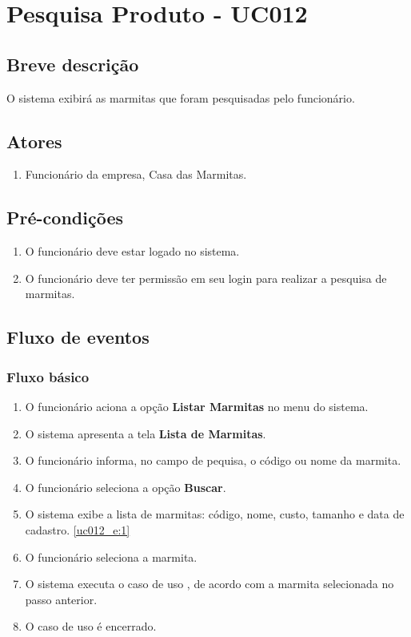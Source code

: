 \chapter{Pesquisa Produto - UC012} \label{uc012}

\section{Breve descrição}

O sistema exibirá as marmitas que foram pesquisadas pelo funcionário.

\section{Atores}

\begin{enumerate}
	\item Funcionário da empresa, Casa das Marmitas.
\end{enumerate}

\section{Pré-condições}

\begin{enumerate}
	\item O funcionário deve estar logado no sistema.
	\item O funcionário deve ter permissão em seu login para realizar a pesquisa de marmitas.
\end{enumerate}

\section{Fluxo de eventos}

\subsection{Fluxo básico}

\begin{enumerate}[label=P\arabic*]
	\item O funcionário aciona a opção \textbf{Listar Marmitas} no menu do sistema.
	\item O sistema apresenta a tela \textbf{Lista de Marmitas}. \label{uc012_p:2}	
	\item O funcionário informa, no campo de pequisa, o código ou nome da marmita.
	\item O funcionário seleciona a opção \textbf{Buscar}.
	\item O sistema exibe a lista de marmitas: código, nome, custo, tamanho e data de cadastro. \label{uc012_p:5}\ref{uc012_e:1}
	\item O funcionário seleciona a marmita.
	\item O sistema executa o caso de uso , de acordo com a marmita selecionada no passo anterior.
	\item O caso de uso é encerrado.
\end{enumerate}

